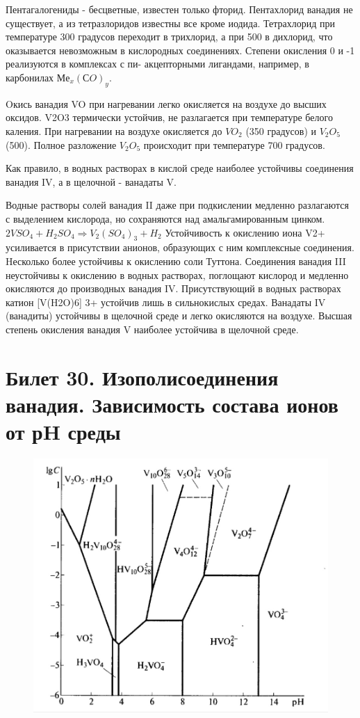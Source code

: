 \documentclass[11pt]{article}
\begin{document}
Пентагалогениды - бесцветные, известен только фторид. Пентахлорид ванадия не существует, а из тетразлоридов известны все кроме иодида. Тетрахлорид при температуре 300
градусов переходит в трихлорид, а при 500 в дихлорид, что оказывается невозможным в
кислородных соединениях. Степени окисления 0 и -1 реализуются в комплексах с пи-
акцепторными лигандами, например, в карбонилах $Ме_x(СO)_y$.


Oкись ванадия VO при нагревании легко окисляется на воздухе до высших оксидов. V2O3
термически устойчив, не разлагается при температуре белого каления. При нагревании на
воздухе окисляется до $VO_2$ (350 градусов) и $V_2O_5$ (500). Полное разложение $V_2O_5$
происходит при температуре 700 градусов.

Как правило, в водных растворах в кислой среде наиболее устойчивы соединения ванадия
IV, а в щелочной - ванадаты V.

Водные растворы солей ванадия II даже при подкислении медленно разлагаются с
выделением кислорода, но сохраняются над амальгамированным цинком.
$2VSO_4 + H_2SO_4 \Rightarrow V_2(SO_4)_3 + H_2$
Устойчивость к окислению иона V2+ усиливается в присутствии анионов, образующих с
ним комплексные соединения. Hесколько более устойчивы к окислению соли Туттона.
Соединения ванадия III неустойчивы к окислению в водных растворах, поглощают
кислород и медленно окисляются до производных ванадия IV. Присутствующий в водных
растворах катион [V(H2O)6] 3+ устойчив лишь в сильнокислых средах.
Ванадаты IV (ванадиты) устойчивы в щелочной среде и легко окисляются на воздухе.
Высшая степень окисления ванадия V наиболее устойчива в щелочной среде.

\section{Билет 30. Изополисоединения ванадия. Зависимость состава ионов от рH среды}

\begin{figure}[htp]
\centering
\includegraphics[scale=0.500]{vph.jpg}
\caption{}
\label{}
\end{figure}
\end{document}
